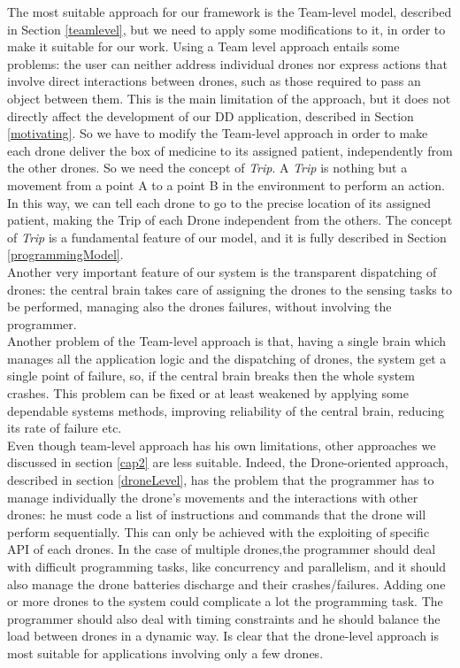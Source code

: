 The most suitable approach for our framework is the Team-level model, described in Section \ref{teamlevel}, but we need to apply some modifications to it, in order to make it suitable for our work.
Using a Team level approach entails some problems:
the user can neither address individual drones nor express actions that involve direct interactions between drones, such as those required to pass an object between them.
This is the main limitation of the approach, but it does not directly affect the development of our DD application, described in Section \ref{motivating}.
So we have to modify the Team-level approach in order to make each drone deliver the box of medicine to its assigned patient, independently from the other drones. 
So we need the concept of \textit{Trip}.
A \textit{Trip} is nothing but a movement from a point A to a point B in the environment to perform an action.
In this way, we can tell each drone to go to the precise location of its assigned patient, making the Trip of each Drone independent from the others.
The concept of \textit{Trip} is a fundamental feature of our model, and it is fully described in Section \ref{programmingModel}.
\\

Another very important feature of our system is the transparent dispatching of drones:
the central brain takes care of assigning the drones to the sensing tasks to be performed, managing also the drones failures, without involving the programmer.
\\

Another problem of the Team-level approach is that, having a single brain which manages all the application logic and the dispatching of drones, the system get a single point of failure, so, if the central brain breaks then the whole system crashes.
This problem can be fixed or at least weakened by applying some dependable systems methods, improving reliability of the central brain, reducing its rate of failure etc.
\\

Even though team-level approach has his own limitations, other approaches we discussed in section \ref{cap2} are less suitable.
Indeed, the Drone-oriented approach, described in section \ref{droneLevel}, has the problem that the programmer has to manage individually the drone's movements and the interactions with other drones: he must code a list of instructions and commands that the drone will perform sequentially. This can only be achieved with the exploiting of specific API of each drones.
In the case of multiple drones,the programmer should deal with difficult programming tasks, like concurrency and parallelism, and it should also manage the drone batteries discharge and their crashes/failures.
Adding one or more drones to the system could complicate a lot the programming task. The programmer should also deal with timing constraints and he should balance the load between drones in a dynamic way.
Is clear that the drone-level approach is most suitable for applications involving only a few drones.
\\

